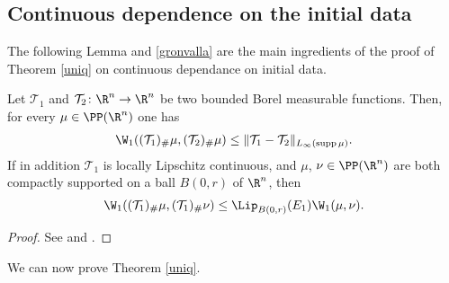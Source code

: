 \subsection{Continuous dependence on the initial data}\label{ap4}

The following Lemma and \eqref{gronvalla} are the main ingredients of the proof of Theorem \ref{uniq} on continuous dependance on initial data.

\begin{lemma}\label{primstim}
Let $\mathcal{T}_1$ and $\mathcal{T}_2 \colon \R^n \to \R^n$ be two bounded Borel measurable functions. Then, for every $\mu \in \PP(\R^n)$ one has
\begin{align*}
\W_1((\mathcal{T}_1)_{\#}\mu, (\mathcal{T}_2)_{\#} \mu) \le \|\mathcal{T}_1-\mathcal{T}_2\|_{L_\infty({\rm supp}\,\mu)}.
\end{align*}
If in addition $\mathcal{T}_1$ is locally Lipschitz continuous, and $\mu$, $\nu \in \PP(\R^n)$ are both compactly supported on a ball $B(0,r)$ of $\R^n$, then
\begin{align*}
\W_1((\mathcal{T}_1)_{\#} \mu, (\mathcal{T}_1)_{\#} \nu) \le \Lip_{B(0,r)}(E_1) \W_1(\mu, \nu).
\end{align*}
\end{lemma}

\begin{proof}
See \cite[Lemma 3.11]{CanCarRos10} and \cite[Lemma 3.13]{CanCarRos10}.
\end{proof}

We can now prove Theorem \ref{uniq}.

